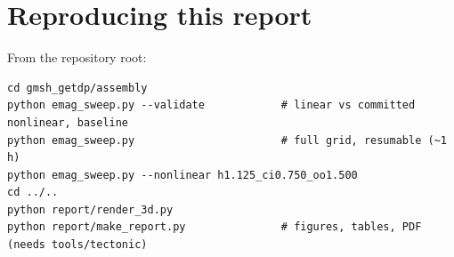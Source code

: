 \documentclass[10pt]{article}
\begin{document}
\section{Reproducing this report}
From the repository root:
\begin{verbatim}
cd gmsh_getdp/assembly
python emag_sweep.py --validate            # linear vs committed nonlinear, baseline
python emag_sweep.py                       # full grid, resumable (~1 h)
python emag_sweep.py --nonlinear h1.125_ci0.750_oo1.500
cd ../..
python report/render_3d.py
python report/make_report.py               # figures, tables, PDF (needs tools/tectonic)
\end{verbatim}
\end{document}
